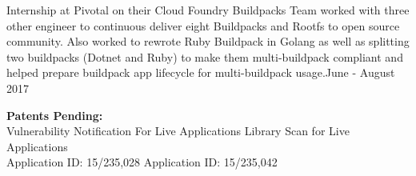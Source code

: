 \documentclass[10pt,a4papaer]{article}
\begin{document}
{{\noindent Internship at Pivotal on their Cloud Foundry Buildpacks Team worked with three other engineer to continuous deliver eight Buildpacks and Rootfs to open source community. Also worked to rewrote Ruby Buildpack in Golang as well as splitting two buildpacks (Dotnet and Ruby) to make them multi-buildpack compliant and helped prepare buildpack app lifecycle for multi-buildpack usage.}{\hfill June - August 2017}\\

\setlength{\leftskip}{0pt}

{\noindent\textbf{Patents Pending:}\\}
Vulnerability Notification For Live Applications {\hfill Library Scan for Live Applications}\\
Application ID: 15/235,028 {\hfill Application ID: 15/235,042\qquad\quad\space}


}
\end{document}
